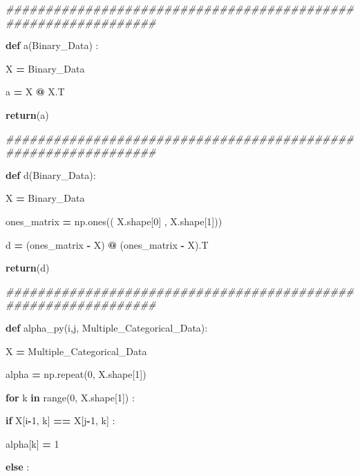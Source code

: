 \documentclass[
  11pt,
  a4paper,
]{article}
\newenvironment{Shaded}{\begin{snugshade}}{\end{snugshade}}
\newcommand{\BuiltInTok}[1]{#1}
\newcommand{\CommentTok}[1]{\textcolor[rgb]{0.56,0.35,0.01}{\textit{#1}}}
\newcommand{\ControlFlowTok}[1]{\textcolor[rgb]{0.13,0.29,0.53}{\textbf{#1}}}
\newcommand{\DecValTok}[1]{\textcolor[rgb]{0.00,0.00,0.81}{#1}}
\newcommand{\KeywordTok}[1]{\textcolor[rgb]{0.13,0.29,0.53}{\textbf{#1}}}
\newcommand{\NormalTok}[1]{#1}
\newcommand{\OperatorTok}[1]{\textcolor[rgb]{0.81,0.36,0.00}{\textbf{#1}}}
\begin{document}
\begin{Shaded}
\begin{Highlighting}[]
\CommentTok{\#\#\#\#\#\#\#\#\#\#\#\#\#\#\#\#\#\#\#\#\#\#\#\#\#\#\#\#\#\#\#\#\#\#\#\#\#\#\#\#\#\#\#\#\#\#\#\#\#\#\#\#\#\#\#\#\#\#\#\#\#\#\#}
    
    \KeywordTok{def}\NormalTok{ a(Binary\_Data) :}

\NormalTok{            X }\OperatorTok{=}\NormalTok{ Binary\_Data}

\NormalTok{            a }\OperatorTok{=}\NormalTok{ X }\OperatorTok{@}\NormalTok{ X.T}

            \ControlFlowTok{return}\NormalTok{(a)}

\CommentTok{\#\#\#\#\#\#\#\#\#\#\#\#\#\#\#\#\#\#\#\#\#\#\#\#\#\#\#\#\#\#\#\#\#\#\#\#\#\#\#\#\#\#\#\#\#\#\#\#\#\#\#\#\#\#\#\#\#\#\#\#\#\#\#}

    \KeywordTok{def}\NormalTok{ d(Binary\_Data):}

\NormalTok{            X }\OperatorTok{=}\NormalTok{ Binary\_Data}

\NormalTok{            ones\_matrix }\OperatorTok{=}\NormalTok{ np.ones(( X.shape[}\DecValTok{0}\NormalTok{] , X.shape[}\DecValTok{1}\NormalTok{])) }

\NormalTok{            d }\OperatorTok{=}\NormalTok{ (ones\_matrix }\OperatorTok{{-}}\NormalTok{ X) }\OperatorTok{@}\NormalTok{ (ones\_matrix }\OperatorTok{{-}}\NormalTok{ X).T}

            \ControlFlowTok{return}\NormalTok{(d)}

\CommentTok{\#\#\#\#\#\#\#\#\#\#\#\#\#\#\#\#\#\#\#\#\#\#\#\#\#\#\#\#\#\#\#\#\#\#\#\#\#\#\#\#\#\#\#\#\#\#\#\#\#\#\#\#\#\#\#\#\#\#\#\#\#\#\#}

    \KeywordTok{def}\NormalTok{ alpha\_py(i,j, Multiple\_Categorical\_Data):}

\NormalTok{        X }\OperatorTok{=}\NormalTok{ Multiple\_Categorical\_Data}

\NormalTok{        alpha }\OperatorTok{=}\NormalTok{ np.repeat(}\DecValTok{0}\NormalTok{, X.shape[}\DecValTok{1}\NormalTok{])}

        \ControlFlowTok{for}\NormalTok{ k }\KeywordTok{in} \BuiltInTok{range}\NormalTok{(}\DecValTok{0}\NormalTok{, X.shape[}\DecValTok{1}\NormalTok{]) :}

            \ControlFlowTok{if}\NormalTok{ X[i}\OperatorTok{{-}}\DecValTok{1}\NormalTok{, k] }\OperatorTok{==}\NormalTok{ X[j}\OperatorTok{{-}}\DecValTok{1}\NormalTok{, k] :}

\NormalTok{                alpha[k] }\OperatorTok{=} \DecValTok{1}

            \ControlFlowTok{else}\NormalTok{ :}


\end{Highlighting}
\end{Shaded}
\end{document}
